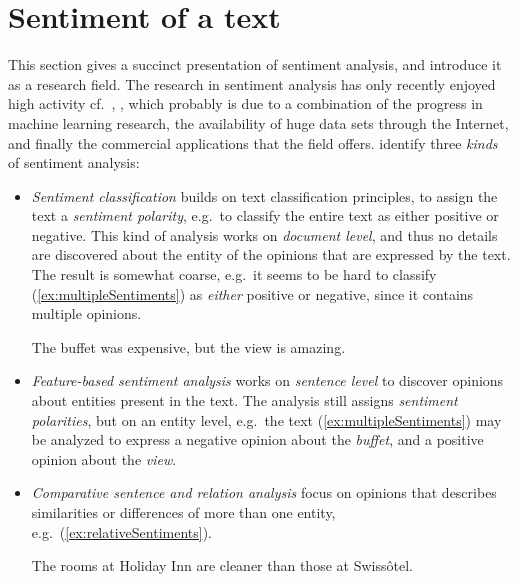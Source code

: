 \section{Sentiment of a text}
This section gives a succinct presentation of sentiment analysis, and introduce it as a research field. The research in sentiment analysis has only recently enjoyed high activity cf.\ \cite{webDataMining}, \cite{omsa}, which probably is due to a combination of the progress in machine learning research, the availability of huge data sets through the Internet, and finally the commercial applications that the field offers. \citeauthor{webDataMining}  identify three \emph{kinds} of sentiment analysis:
\begin{itemize}
	\item \emph{Sentiment classification} builds on text classification principles, to assign the text a \emph{sentiment polarity}, e.g.\ to classify the entire text as either positive or negative. This kind of analysis works on \emph{document level}, and thus no details are discovered about the entity of the opinions that are expressed by the text. The result is somewhat coarse, e.g.\ it  seems to be hard to classify (\ref{ex:multipleSentiments}) as \emph{either} positive or negative, since it contains multiple opinions.
	\vspace{1em}
	\begin{numquote}
		The buffet was expensive, but the view is amazing.
		\label{ex:multipleSentiments}
	\end{numquote}
	\item \emph{Feature-based sentiment analysis} works on \emph{sentence level} to discover opinions about entities present in the text. The analysis still assigns \emph{sentiment polarities}, but on an entity level, e.g.\ the text (\ref{ex:multipleSentiments}) may be analyzed to express a negative opinion about the \emph{buffet}, and a positive opinion about the \emph{view}.
	\item \emph{Comparative sentence and relation analysis} focus on opinions that describes similarities or differences of more than one entity, e.g.\ (\ref{ex:relativeSentiments}).
	\vspace{1em}
	\begin{numquote1}
		The rooms at Holiday Inn are cleaner than those at Swissôtel.		
		\label{ex:relativeSentiments}		
	\end{numquote1}	
\end{itemize}

